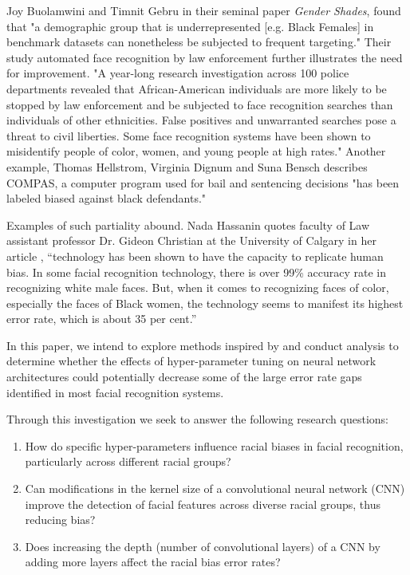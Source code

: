 \documentclass[conference]{IEEEtran}
\begin{document}
Joy Buolamwini and Timnit Gebru in their seminal paper \textit{Gender Shades}\cite{pmlr-v81-buolamwini18a}, found that "a demographic group that is underrepresented [e.g. Black Females] in benchmark datasets can nonetheless be subjected to frequent targeting." Their study automated face recognition by law enforcement further illustrates the need for improvement. "A year-long research investigation across 100 police departments revealed that African-American individuals are more likely to be stopped by law enforcement and be subjected to face recognition searches than individuals of other ethnicities. False positives and unwarranted searches pose a threat to civil liberties. Some face recognition systems have been shown to misidentify people of color, women, and young people at high rates." Another example, Thomas Hellstrom, Virginia Dignum and Suna Bensch describes COMPAS, a computer program used for bail and sentencing decisions "has been labeled biased against black defendants\cite{hellstrom2020bias}."

Examples of such partiality abound. Nada Hassanin quotes faculty of Law assistant professor Dr. Gideon Christian at the University of Calgary in her article \cite{Hassanin_2023}, “technology has been shown to have the capacity to replicate human bias. In some facial recognition technology, there is over 99\% accuracy rate in recognizing white male faces. But, when it comes to recognizing faces of color, especially the faces of Black women, the technology seems to manifest its highest error rate, which is about 35 per cent.”

In this paper, we intend to explore methods inspired by \cite{maze2018iarpa} and conduct analysis to determine whether the effects of hyper-parameter tuning on neural network architectures could potentially decrease some of the large error rate gaps identified in most facial recognition systems. 

Through this investigation we seek to answer the following research questions:
\begin{enumerate}
    \item How do specific hyper-parameters influence racial biases in facial recognition, particularly across different racial groups?
    \item Can modifications in the kernel size of a convolutional neural network (CNN) improve the detection of facial features across diverse racial groups, thus reducing bias?
    \item Does increasing the depth (number of convolutional layers) of a CNN by adding more layers affect the racial bias error rates?
\end{enumerate}
\end{document}
